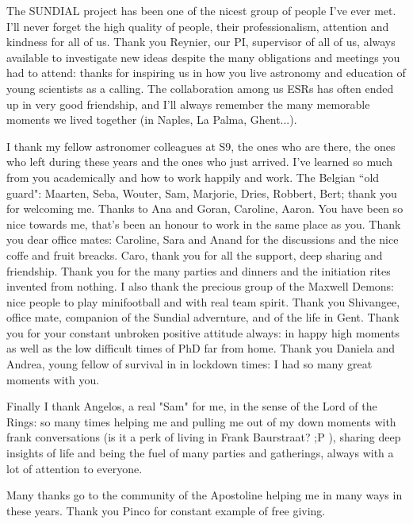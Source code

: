 The SUNDIAL project has been one of the nicest group of people I've ever met. I'll never forget the high quality of people, their professionalism, attention and kindness for all of us.
Thank you Reynier, our PI, supervisor of all of us, always available to investigate new ideas despite the many obligations and meetings you had to attend: thanks for inspiring us in how you live astronomy and education of young scientists as a calling.
The collaboration among us ESRs has often ended up in very good friendship, and I'll always remember the many memorable moments we lived together (in Naples, La Palma, Ghent...).

I thank my fellow astronomer colleagues at S9, the ones who are there, the ones who left during these years and the ones who just arrived. I've learned so much from you academically and how to work happily and work.
The Belgian ``old guard": Maarten, Seba, Wouter, Sam, Marjorie, Dries, Robbert, Bert; thank you for welcoming me. Thanks to Ana and Goran, Caroline, Aaron.
You have been so nice towards me, that's been an honour to work in the same place as you.
Thank you dear office mates: Caroline, Sara and Anand for the discussions and the nice coffe and fruit breacks. Caro, thank you for all the support, deep sharing and friendship.
Thank you for the many parties and dinners and the initiation rites invented from nothing.
I also thank the precious group of the Maxwell Demons: nice people to play minifootball and with real team spirit.
Thank you Shivangee, office mate, companion of the Sundial advernture, and of the life in Gent. Thank you for your constant unbroken positive attitude always: in happy high moments as well as the low difficult times of PhD far from home.
Thank you Daniela and Andrea, young fellow of survival in in lockdown times: I had so many great moments with you.

Finally I thank Angelos, a real "Sam" for me, in the sense of the Lord of the Rings: so many times helping me and pulling me out of my down moments with frank conversations (is it a perk of living in Frank Baurstraat? ;P ), sharing deep insights of life and being the fuel of many parties and gatherings, always with a lot of attention to everyone.

Many thanks go to the community of the Apostoline helping me in many ways in these years.
Thank you Pinco for constant example of free giving.

